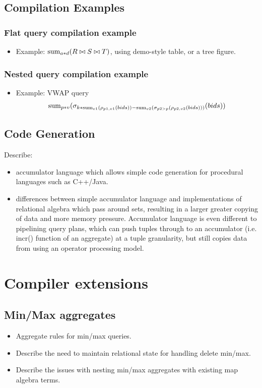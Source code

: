 \documentclass{sig-alternate}
\begin{document}
\subsection{Compilation Examples}
\subsubsection{Flat query compilation example}
\begin{itemize}
\item Example: $\mathrm{sum}_{a*d}(R \bowtie S \bowtie T)$, using demo-style table,
  or a tree figure.
\end{itemize}

\subsubsection{Nested query compilation example}
\begin{itemize}
\item Example: VWAP query
\[\mathrm{sum}_{p*v}(\sigma_{k*\mathrm{sum}_{v1}(\rho_{p1,v1}(bids)) -
    \mathrm{sum}_{v2}(\sigma_{p2 > p}(\rho_{p2,v2}(bids)))}(bids))\]
\end{itemize}

\subsection{Code Generation}
Describe:
\begin{itemize}
\item accumulator language which allows simple code generation for
procedural languages such as C++/Java.
\item differences between simple accumulator language and implementations of
relational algebra which pass around sets, resulting in a larger greater copying
of data and more memory pressure. Accumulator language is even different to
pipelining query plans, which can push tuples through to an accumulator
(i.e. incr() function of an aggregate) at a tuple granularity, but still copies
data from using an operator processing model.
\end{itemize}

\section{Compiler extensions}
\subsection{Min/Max aggregates}
\begin{itemize}
\item Aggregate rules for min/max queries.
\item Describe the need to maintain relational state for handling delete min/max.
\item Describe the issues with nesting min/max aggregates with existing map
  algebra terms.
\end{itemize}
\end{document}
